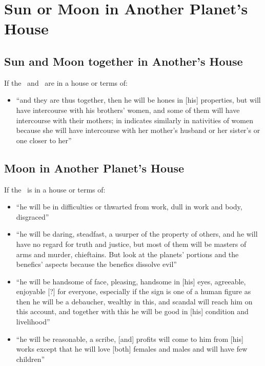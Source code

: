 \section{Sun or Moon in Another Planet's House}
\subsection{Sun and Moon together in Another's House}
If the \Sun\, and \Moon\, are in a house or terms of:
\begin{itemize}[topsep=0em,itemsep=0em]
\item[\Jupiter] ``and they are thus together, then he will be hones in [his] properties, but will have intercourse with his brothers' women, and some of them will have intercourse with their mothers; in indicates similarly in nativities of women because she will have intercourse with her mother's husband or her sister's or one closer to her''
\end{itemize}

\subsection{Moon in Another Planet's House}
If the \Moon\, is in a house or terms of:
\begin{itemize}[topsep=0em,itemsep=0em]
\item[\Saturn] ``he will be in difficulties or thwarted from work, dull in work and body, disgraced''

\item[\Mars] ``he will be daring, steadfast, a usurper of the property of others, and he will have no regard for truth and justice, but most of them will be masters of arms and murder, chieftains. \mndl But look at the planets' portions and the benefics' aspects because the benefics dissolve evil''

\item[\Venus] ``he will be handsome of face, pleasing, handsome in [his] eyes, agreeable, enjoyable [?] for everyone, especially if the sign is one of a human figure as then he will be a debaucher, wealthy in this, and scandal will reach him on this account, and together with this he will be good in [his] condition and livelihood''

\item[\Mercury] ``he will be reasonable, a scribe, [and] profits will come to him from [his] works except that he will love [both] females and males and will have few children''
\end{itemize}

